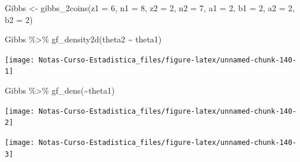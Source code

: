 \documentclass[
  12pt,
]{book}
\newenvironment{Shaded}{\begin{snugshade}}{\end{snugshade}}
\newcommand{\AttributeTok}[1]{\textcolor[rgb]{0.77,0.63,0.00}{#1}}
\newcommand{\DecValTok}[1]{\textcolor[rgb]{0.00,0.00,0.81}{#1}}
\newcommand{\FunctionTok}[1]{\textcolor[rgb]{0.00,0.00,0.00}{#1}}
\newcommand{\NormalTok}[1]{#1}
\newcommand{\OtherTok}[1]{\textcolor[rgb]{0.56,0.35,0.01}{#1}}
\newcommand{\SpecialCharTok}[1]{\textcolor[rgb]{0.00,0.00,0.00}{#1}}
\theoremstyle{definition}
\theoremstyle{definition}
\theoremstyle{definition}
\theoremstyle{remark}
\begin{document}
\begin{Shaded}
\begin{Highlighting}[]
\NormalTok{Gibbs }\OtherTok{\textless{}{-}} \FunctionTok{gibbs\_2coins}\NormalTok{(}\AttributeTok{z1 =} \DecValTok{6}\NormalTok{, }\AttributeTok{n1 =} \DecValTok{8}\NormalTok{, }\AttributeTok{z2 =} \DecValTok{2}\NormalTok{, }\AttributeTok{n2 =} \DecValTok{7}\NormalTok{, }
    \AttributeTok{a1 =} \DecValTok{2}\NormalTok{, }\AttributeTok{b1 =} \DecValTok{2}\NormalTok{, }\AttributeTok{a2 =} \DecValTok{2}\NormalTok{, }\AttributeTok{b2 =} \DecValTok{2}\NormalTok{)}

\NormalTok{Gibbs }\SpecialCharTok{\%\textgreater{}\%} \FunctionTok{gf\_density2d}\NormalTok{(theta2 }\SpecialCharTok{\textasciitilde{}}\NormalTok{ theta1)}
\end{Highlighting}
\end{Shaded}

\begin{center}\texttt{[image: Notas-Curso-Estadistica\_files/figure-latex/unnamed-chunk-140-1]} \end{center}

\begin{Shaded}
\begin{Highlighting}[]
\NormalTok{Gibbs }\SpecialCharTok{\%\textgreater{}\%} \FunctionTok{gf\_dens}\NormalTok{(}\SpecialCharTok{\textasciitilde{}}\NormalTok{theta1)}
\end{Highlighting}
\end{Shaded}

\begin{center}\texttt{[image: Notas-Curso-Estadistica\_files/figure-latex/unnamed-chunk-140-2]} \end{center}

\begin{Shaded}
\end{Shaded}

\begin{center}\texttt{[image: Notas-Curso-Estadistica\_files/figure-latex/unnamed-chunk-140-3]} \end{center}
\end{document}

